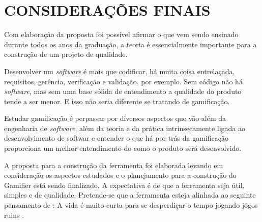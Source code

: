 \chapter[Considerações finais]{CONSIDERAÇÕES FINAIS}

Com elaboração da proposta foi possível afirmar o que vem sendo ensinado durante todos os anos da graduação, a teoria é essencialmente importante para a construção de um projeto de qualidade. 

Desenvolver um \textit{software} é mais que codificar, há muita coisa entrelaçada, requisitos, gerência, verificação e validação, por exemplo. Sem código não há \textit{software}, mas sem uma base sólida de entendimento a qualidade do produto tende a ser menor. E isso não seria diferente se tratando de gamificação.

Estudar gamificação é perpassar por diversos aspectos que vão além da engenharia de \textit{software}, além da teoria e da prática intrinsecamente ligada ao desenvolvimento de softwar e entender o que há por trás da gamificação proporciona um melhor entendimento do como o produto será desenvolvido.

A proposta para a construção da ferramenta foi elaborada levando em consideração os aspectos estudados e o planejamento para a construção do Gamifier está sendo finalizado. A expectativa é de que a ferramenta seja útil, simples e de qualidade. Pretende-se que a ferramenta esteja alinhada ao seguinte pensamento de \cite{chou2015actionable}: A vida é muito curta para se desperdiçar o tempo jogando jogos ruins . 
